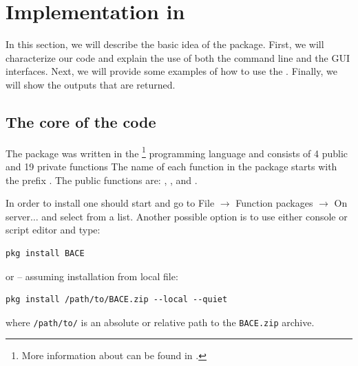 \section{Implementation in }\label{sec:BACE_implementation}
In this section, we will describe the basic idea of
the  package. First, we will characterize our
code and explain the use of both the command line and
the GUI interfaces. Next, we will provide some examples
of how to use the . Finally, we will show the
outputs that are returned.

\subsection{The core of the  code}
The  package was written in the %
\footnote{More information about  can be found
	in \cite{cottrell_luchcetti_gretl_hansl}.}
programming language and consists of 4 public and 19
private functions
The name of each function in the  package starts with
the prefix . The public functions are: ,
,  and .

In order to install  one should start 
and go to File $\rightarrow$ Function packages $\rightarrow$
On server$\ldots$ and select  from a list. Another
possible option is to use either  console or
script editor and type:
\begin{lstlisting}
pkg install BACE
\end{lstlisting}
or -- assuming installation from local file:
\begin{lstlisting}
pkg install /path/to/BACE.zip --local --quiet
\end{lstlisting}
where \texttt{/path/to/} is an absolute or relative
path to the \texttt{BACE.zip} archive.


